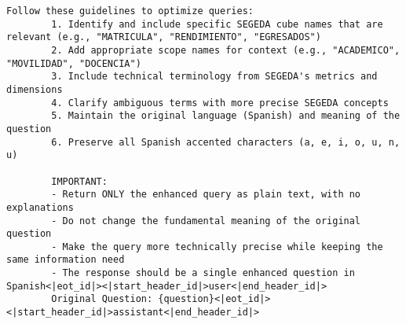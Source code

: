 \begin{itemize}
\begin{lstlisting}[breaklines=true,basicstyle=\small\ttfamily]
        Follow these guidelines to optimize queries:
        1. Identify and include specific SEGEDA cube names that are relevant (e.g., "MATRICULA", "RENDIMIENTO", "EGRESADOS")
        2. Add appropriate scope names for context (e.g., "ACADEMICO", "MOVILIDAD", "DOCENCIA")
        3. Include technical terminology from SEGEDA's metrics and dimensions
        4. Clarify ambiguous terms with more precise SEGEDA concepts
        5. Maintain the original language (Spanish) and meaning of the question
        6. Preserve all Spanish accented characters (a, e, i, o, u, n, u)
        
        IMPORTANT:
        - Return ONLY the enhanced query as plain text, with no explanations
        - Do not change the fundamental meaning of the original question
        - Make the query more technically precise while keeping the same information need
        - The response should be a single enhanced question in Spanish<|eot_id|><|start_header_id|>user<|end_header_id|>
        Original Question: {question}<|eot_id|><|start_header_id|>assistant<|end_header_id|>
    \end{lstlisting}

\end{itemize}

